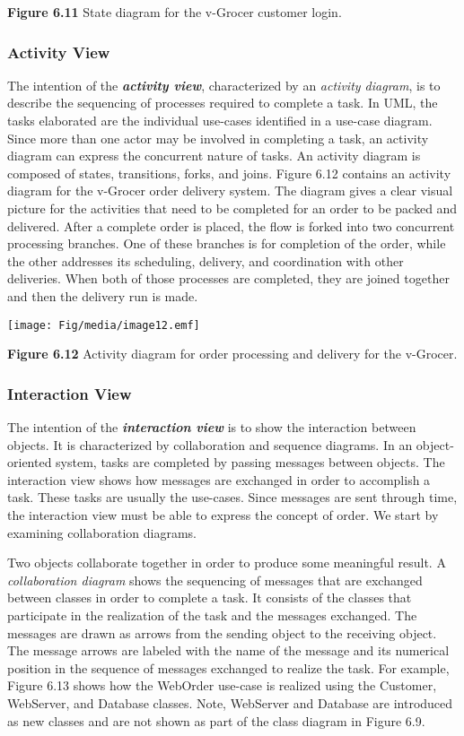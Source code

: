 \textbf{Figure 6.11} State diagram for the v-Grocer customer login.

\subsubsection{Activity View}\label{activity-view}

The intention of the \emph{\textbf{activity view}}, characterized by an
\emph{activity diagram}, is to describe the sequencing of processes
required to complete a task. In UML, the tasks elaborated are the
individual use-cases identified in a use-case diagram. Since more than
one actor may be involved in completing a task, an activity diagram can
express the concurrent nature of tasks. An activity diagram is composed
of states, transitions, forks, and joins. Figure 6.12 contains an
activity diagram for the v-Grocer order delivery system. The diagram
gives a clear visual picture for the activities that need to be
completed for an order to be packed and delivered. After a complete
order is placed, the flow is forked into two concurrent processing
branches. One of these branches is for completion of the order, while
the other addresses its scheduling, delivery, and coordination with
other deliveries. When both of those processes are completed, they are
joined together and then the delivery run is made.

\texttt{[image: Fig/media/image12.emf]}

\textbf{Figure 6.12} Activity diagram for order processing and delivery
for the v-Grocer.

\subsubsection{Interaction View}\label{interaction-view}

The intention of the \emph{\textbf{interaction view}} is to show the
interaction between objects. It is characterized by collaboration and
sequence diagrams. In an object-oriented system, tasks are completed by
passing messages between objects. The interaction view shows how
messages are exchanged in order to accomplish a task. These tasks are
usually the use-cases. Since messages are sent through time, the
interaction view must be able to express the concept of order. We start
by examining collaboration diagrams.

Two objects collaborate together in order to produce some meaningful
result. A \emph{collaboration diagram} shows the sequencing of messages
that are exchanged between classes in order to complete a task. It
consists of the classes that participate in the realization of the task
and the messages exchanged. The messages are drawn as arrows from the
sending object to the receiving object. The message arrows are labeled
with the name of the message and its numerical position in the sequence
of messages exchanged to realize the task. For example, Figure 6.13
shows how the WebOrder use-case is realized using the Customer,
WebServer, and Database classes. Note, WebServer and Database are
introduced as new classes and are not shown as part of the class diagram
in Figure 6.9.

